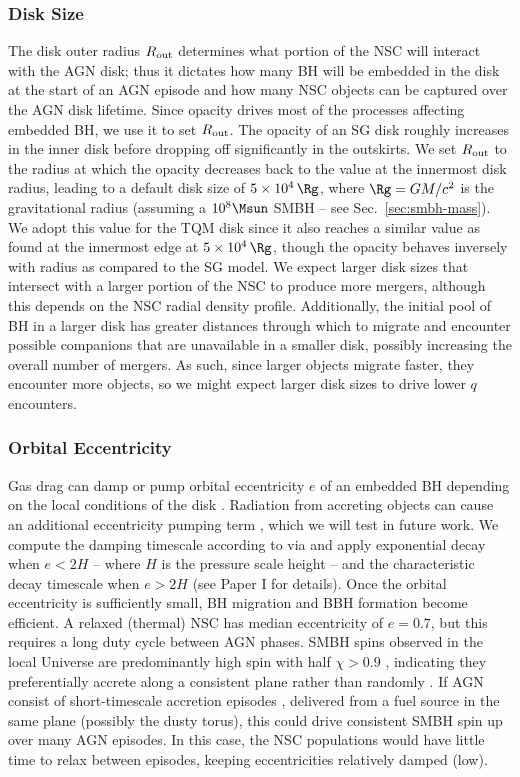 \subsubsection{Disk Size}
The disk outer radius $R_{\rm out}$ determines what portion of the NSC will interact with the AGN disk; thus it dictates how many BH will be embedded in the disk at the start of an AGN episode and how many NSC objects can be captured over the AGN disk lifetime.
Since opacity drives most of the processes affecting embedded BH, we use it to set $R_{\rm out}$.
The opacity of an SG disk roughly increases in the inner disk before dropping off significantly in the outskirts.
We set $R_{\rm out}$ to the radius at which the opacity decreases back to the value at the innermost disk radius, leading to a default disk size of $5\times10^4\,\Rg$, where $\Rg = GM/c^2$ is the gravitational radius (assuming a $10^{8}\Msun$ SMBH -- see Sec.~\ref{sec:smbh-mass}).
We adopt this value for the TQM disk since it also reaches a similar value as found at the innermost edge at $5\times10^4\,\Rg$, though the opacity behaves inversely with radius as compared to the SG model.
We expect larger disk sizes that intersect with a larger portion of the NSC to produce more mergers, although this depends on the NSC radial density profile.
Additionally, the initial pool of BH in a larger disk has greater distances through which to migrate and encounter possible companions that are unavailable in a smaller disk, possibly increasing the overall number of mergers.
As such, since larger objects migrate faster, they encounter more objects, so we might expect larger disk sizes to drive lower $q$ encounters.

\subsubsection{Orbital Eccentricity}
Gas drag can damp or pump orbital eccentricity $e$ of an embedded BH depending on the local conditions of the disk \citep{McKernan+12, Secunda+21, McKernanFord24, SzolgyenMacLeodLoeb22}.
Radiation from accreting objects can cause an additional eccentricity pumping term \citep{Cornejo+23}, which we will test in future work.
We compute the damping timescale according to \citet{TanakaWard04} via \citet{McKernanFord24} and apply \citet{PapaloizouLarwood00} exponential decay when $e<2H$ -- where $H$ is the pressure scale height -- and the characteristic decay timescale when $e>2H$ \citep{BitschKley10, Horn+12} (see Paper I for details).
Once the orbital eccentricity is sufficiently small, BH migration and BBH formation become efficient.
A relaxed (thermal) NSC has median eccentricity of $e=0.7$, but this requires a long duty cycle between AGN phases.
SMBH spins observed in the local Universe are predominantly high spin with half $\chi>0.9$ \citep{Reynolds19}, indicating they preferentially accrete along a consistent plane rather than randomly \citep{Volonteri+05}.
If AGN consist of short-timescale accretion episodes \citep{Schawinski+15,Shen21}, delivered from a fuel source in the same plane (possibly the dusty torus), this could drive consistent SMBH spin up over many AGN episodes.
In this case, the NSC populations would have little time to relax between episodes, keeping eccentricities relatively damped (low).

